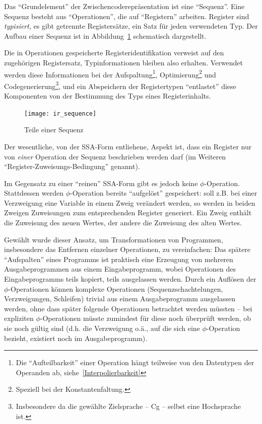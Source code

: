 \documentclass[twoside,a4paper,fleqn,12pt]{book}
\begin{document}
Das "`Grundelement"' der Zwischencoderepräsentation ist eine "`Sequenz"'. Eine Sequenz besteht aus "`Operationen"',
die auf "`Registern"' arbeiten. Register sind \emph{typisiert}, es gibt getrennte Registersätze, ein Satz für jeden verwendeten Typ. 
Der Aufbau einer Sequenz ist in Abbildung~\ref{fig:ir_sequence} schematisch dargestellt.

Die in Operationen gespeicherte Registeridentifikation verweist auf den zugehörigen Registersatz, Typinformationen bleiben also erhalten.
Verwendet werden diese Informationen bei der Aufspaltung\footnote{Die "`Aufteilbarkeit"' einer Operation hängt teilweise von den Datentypen der Operanden ab,
siehe~\ref{Interpolierbarkeit}},
Optimierung\footnote{Speziell bei der Konstantenfaltung.} und
Codegenerierung\footnote{Insbesondere da die gewählte Zielsprache -- Cg -- selbst eine Hochsprache ist.},
und ein Abspeichern der Registertypen "`entlastet"' diese Komponenten von der Bestimmung des Typs eines Registerinhalts.

\begin{figure}[h]
   \centering
  \texttt{[image: ir\_sequence]}
  \caption{Teile einer Sequenz}
  \label{fig:ir_sequence}
\end{figure}

Der wesentliche, von der SSA-Form entliehene, Aspekt ist, dass ein Register nur von \emph{einer} Operation der Sequenz beschrieben werden darf
(im Weiteren "`Register-Zuweisungs-Bedingung"' genannt).

Im Gegensatz zu einer "`reinen"' SSA-Form gibt es jedoch keine $\phi$-Operation. Stattdessen werden $\phi$-Operation bereits "`aufgelöst"'
gespeichert: soll z.B. bei einer Verzweigung eine Variable in einem Zweig verändert werden, so werden in beiden Zweigen Zuweisungen zum
entsprechenden Register generiert. Ein Zweig enthält die Zuweisung des neuen Wertes, der andere die Zuweisung des alten Wertes.

Gewählt wurde dieser Ansatz, um Transformationen von Programmen, insbesondere das Entfernen einzelner Operationen, zu vereinfachen:
Das spätere "`Aufspalten"' eines Programms ist praktisch eine Erzeugung von mehreren Ausgabeprogrammen aus einem Eingabeprogramm,
wobei Operationen des Eingabeprogramms teils kopiert, teils ausgelassen werden. Durch ein Auflösen der $\phi$-Operationen können
komplexe Operationen (Sequenzschachtelungen, Verzweigungen, Schleifen)
trivial aus einem Ausgabeprogramm ausgelassen werden, ohne dass später folgende Operationen betrachtet werden müssten -- 
bei expliziten $\phi$-Operationen müsste zumindest für diese noch überprüft
werden, ob sie noch gültig sind (d.h. die Verzweigung o.ä., auf die sich eine $\phi$-Operation bezieht, existiert noch im Ausgabeprogramm).
\end{document}
